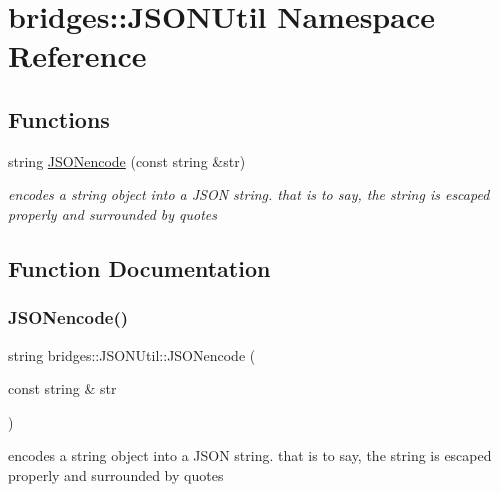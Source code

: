 \hypertarget{namespacebridges_1_1_j_s_o_n_util}{}\section{bridges\+:\+:J\+S\+O\+N\+Util Namespace Reference}
\label{namespacebridges_1_1_j_s_o_n_util}
\subsection*{Functions}
\begin{DoxyCompactItemize}
\item 
string \mbox{\hyperlink{namespacebridges_1_1_j_s_o_n_util_abf11dd735ae4a4ab8e6e2e89340a1b07}{J\+S\+O\+Nencode}} (const string \&str)
\begin{DoxyCompactList}\small\item\em encodes a string object into a J\+S\+ON string. that is to say, the string is escaped properly and surrounded by quotes \end{DoxyCompactList}\end{DoxyCompactItemize}


\subsection{Function Documentation}
\mbox{\label{namespacebridges_1_1_j_s_o_n_util_abf11dd735ae4a4ab8e6e2e89340a1b07}} 
\subsubsection{\texorpdfstring{J\+S\+O\+Nencode()}{JSONencode()}}
{\footnotesize\ttfamily string bridges\+::\+J\+S\+O\+N\+Util\+::\+J\+S\+O\+Nencode (\begin{DoxyParamCaption}\item[{const string \&}]{str }\end{DoxyParamCaption})\hspace{0.3cm}{\ttfamily [inline]}}



encodes a string object into a J\+S\+ON string. that is to say, the string is escaped properly and surrounded by quotes 

